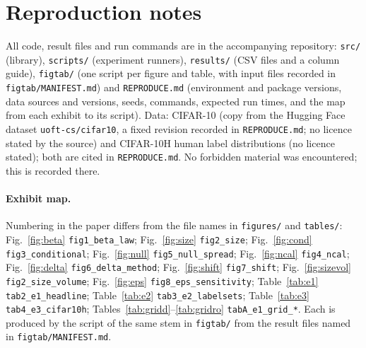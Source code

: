 \section{Reproduction notes}\label{app:repro}
All code, result files and run commands are in the accompanying repository: \texttt{src/} (library), \texttt{scripts/} (experiment runners), \texttt{results/} (CSV files and a column guide), \texttt{figtab/} (one script per figure and table, with input files recorded in \texttt{figtab/MANIFEST.md}) and \texttt{REPRODUCE.md} (environment and package versions, data sources and versions, seeds, commands, expected run times, and the map from each exhibit to its script). Data: CIFAR-10 (copy from the Hugging Face dataset \texttt{uoft-cs/cifar10}, a fixed revision recorded in \texttt{REPRODUCE.md}; no licence stated by the source) and CIFAR-10H human label distributions (no licence stated); both are cited in \texttt{REPRODUCE.md}. No forbidden material was encountered; this is recorded there.


\paragraph{Exhibit map.} Numbering in the paper differs from the file names in \texttt{figures/} and \texttt{tables/}: Fig.~\ref{fig:beta} \texttt{fig1\_beta\_law}; Fig.~\ref{fig:size} \texttt{fig2\_size}; Fig.~\ref{fig:cond} \texttt{fig3\_conditional}; Fig.~\ref{fig:null} \texttt{fig5\_null\_spread}; Fig.~\ref{fig:ncal} \texttt{fig4\_ncal}; Fig.~\ref{fig:delta} \texttt{fig6\_delta\_method}; Fig.~\ref{fig:shift} \texttt{fig7\_shift}; Fig.~\ref{fig:sizevol} \texttt{fig2\_size\_volume}; Fig.~\ref{fig:eps} \texttt{fig8\_eps\_sensitivity}; Table~\ref{tab:e1} \texttt{tab2\_e1\_headline}; Table~\ref{tab:e2} \texttt{tab3\_e2\_labelsets}; Table~\ref{tab:e3} \texttt{tab4\_e3\_cifar10h}; Tables~\ref{tab:gridd}--\ref{tab:gridro} \texttt{tabA\_e1\_grid\_*}. Each is produced by the script of the same stem in \texttt{figtab/} from the result files named in \texttt{figtab/MANIFEST.md}.
